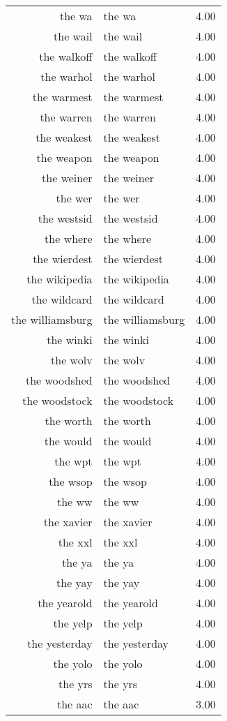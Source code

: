 \begin{table}[ht]
\begin{tabular}{rlr}
  the wa & the wa & 4.00 \\ 
  the wail & the wail & 4.00 \\ 
  the walkoff & the walkoff & 4.00 \\ 
  the warhol & the warhol & 4.00 \\ 
  the warmest & the warmest & 4.00 \\ 
  the warren & the warren & 4.00 \\ 
  the weakest & the weakest & 4.00 \\ 
  the weapon & the weapon & 4.00 \\ 
  the weiner & the weiner & 4.00 \\ 
  the wer & the wer & 4.00 \\ 
  the westsid & the westsid & 4.00 \\ 
  the where & the where & 4.00 \\ 
  the wierdest & the wierdest & 4.00 \\ 
  the wikipedia & the wikipedia & 4.00 \\ 
  the wildcard & the wildcard & 4.00 \\ 
  the williamsburg & the williamsburg & 4.00 \\ 
  the winki & the winki & 4.00 \\ 
  the wolv & the wolv & 4.00 \\ 
  the woodshed & the woodshed & 4.00 \\ 
  the woodstock & the woodstock & 4.00 \\ 
  the worth & the worth & 4.00 \\ 
  the would & the would & 4.00 \\ 
  the wpt & the wpt & 4.00 \\ 
  the wsop & the wsop & 4.00 \\ 
  the ww & the ww & 4.00 \\ 
  the xavier & the xavier & 4.00 \\ 
  the xxl & the xxl & 4.00 \\ 
  the ya & the ya & 4.00 \\ 
  the yay & the yay & 4.00 \\ 
  the yearold & the yearold & 4.00 \\ 
  the yelp & the yelp & 4.00 \\ 
  the yesterday & the yesterday & 4.00 \\ 
  the yolo & the yolo & 4.00 \\ 
  the yrs & the yrs & 4.00 \\ 
  the aac & the aac & 3.00 \\ 

\end{tabular}
\end{table}
